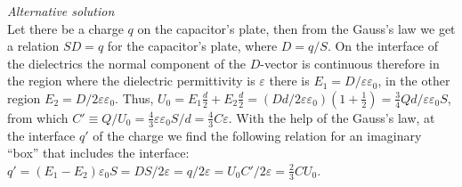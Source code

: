 \emph{Alternative solution}\\
Let there be a charge $q$ on the capacitor’s plate, then from the Gauss’s law we get a relation $SD=q$ for the capacitor’s plate, where $D=q/S$. On the interface of the dielectrics the normal component of the $D$-vector is continuous therefore in the region where the dielectric permittivity is $\varepsilon$ there is $E_1=D/\varepsilon\varepsilon_0$, in the other region $E_2=D/2\varepsilon\varepsilon_0$. Thus, $U_0=E_1\frac d2+E_2\frac d2=(Dd/2\varepsilon\varepsilon_0)(1+\frac 12)=\frac 34Qd/\varepsilon\varepsilon_0S$, from which $C'\equiv Q/U_0=\frac 43\varepsilon\varepsilon_0S/d=\frac 43C\varepsilon$. With the help of the Gauss’s law, at the interface $q'$ of the charge we find the following relation for an imaginary “box” that includes the interface: $q'=(E_1-E_2)\varepsilon_0S=DS/2\varepsilon=q/2\varepsilon=U_0C'/2\varepsilon=\frac 23CU_0$.
\probend